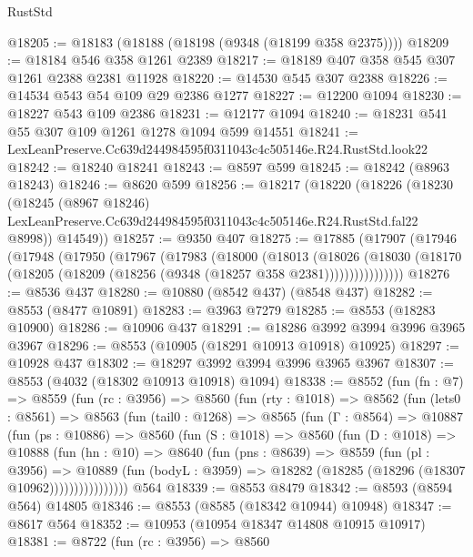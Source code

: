 \begin{lexlean}{RustStd}
\begin{coremodule}
@18205 := @18183 (@18188 (@18198 (@9348 (@18199 @358 @2375))))
@18209 := @18184 @546 @358 @1261 @2389
@18217 := @18189 @407 @358 @545 @307 @1261 @2388 @2381 @11928
@18220 := @14530 @545 @307 @2388
@18226 := @14534 @543 @54 @109 @29 @2386 @1277
@18227 := @12200 @1094
@18230 := @18227 @543 @109 @2386
@18231 := @12177 @1094
@18240 := @18231 @541 @55 @307 @109 @1261 @1278 @1094 @599 @14551
@18241 := LexLeanPreserve.Cc639d244984595f0311043c4c505146e.R24.RustStd.look22
@18242 := @18240 @18241
@18243 := @8597 @599
@18245 := @18242 (@8963 @18243)
@18246 := @8620 @599
@18256 := @18217
    (@18220
      (@18226
        (@18230
          (@18245
            (@8967 @18246)
            LexLeanPreserve.Cc639d244984595f0311043c4c505146e.R24.RustStd.fal22
            @8998))
        @14549))
@18257 := @9350 @407
@18275 := @17885
    (@17907
      (@17946
        (@17948
          (@17950
            (@17967
              (@17983
                (@18000
                  (@18013
                    (@18026
                      (@18030
                        (@18170 (@18205 (@18209 (@18256 (@9348 (@18257 @358 @2381))))))))))))))))
@18276 := @8536 @437
@18280 := @10880 (@8542 @437) (@8548 @437)
@18282 := @8553 (@8477 @10891)
@18283 := @3963 @7279
@18285 := @8553 (@18283 @10900)
@18286 := @10906 @437
@18291 := @18286 @3992 @3994 @3996 @3965 @3967
@18296 := @8553 (@10905 (@18291 @10913 @10918) @10925)
@18297 := @10928 @437
@18302 := @18297 @3992 @3994 @3996 @3965 @3967
@18307 := @8553 (@4032 (@18302 @10913 @10918) @1094)
@18338 := @8552
    (fun (fn : @7) =>
    @8559
      (fun (rc : @3956) =>
      @8560
        (fun (rty : @1018) =>
        @8562
          (fun (lets0 : @8561) =>
          @8563
            (fun (tail0 : @1268) =>
            @8565
              (fun (Γ : @8564) =>
              @10887
                (fun (ps : @10886) =>
                @8560
                  (fun (S : @1018) =>
                  @8560
                    (fun (D : @1018) =>
                    @10888
                      (fun (hn : @10) =>
                      @8640
                        (fun (pns : @8639) =>
                        @8559
                          (fun (pl : @3956) =>
                          @10889
                            (fun (bodyL : @3959) =>
                            @18282 (@18285 (@18296 (@18307 @10962))))))))))))))))
    @564
@18339 := @8553 @8479
@18342 := @8593 (@8594 @564) @14805
@18346 := @8553 (@8585 (@18342 @10944) @10948)
@18347 := @8617 @564
@18352 := @10953 (@10954 @18347 @14808 @10915 @10917)
@18381 := @8722
    (fun (rc : @3956) =>
    @8560

\end{coremodule}
\end{lexlean}
